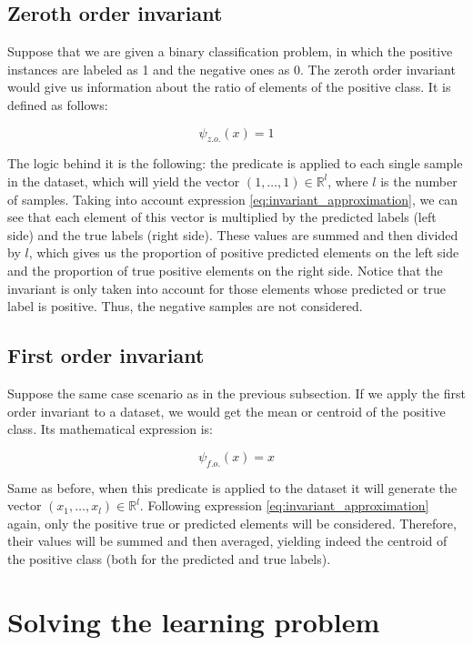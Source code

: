 \subsection{Zeroth order invariant}

Suppose that we are given a binary classification problem, in which the positive instances
are labeled as 1 and the negative ones as 0. The zeroth order invariant would give us information
about the ratio of elements of the positive class. It is defined as follows:

\[
    \psi_{z.o.}(x) = 1
\]

The logic behind it is the following: the predicate is applied to each single sample in the dataset,
which will yield the vector $(1, \dots, 1) \in \mathbb{R}^l $, where $l$ is the number of samples. Taking into account
expression \eqref{eq:invariant_approximation}, we can see that each element of this vector is multiplied
by the predicted labels (left side) and the true labels (right side). These values are summed and then divided
by $l$, which gives us the proportion of positive predicted elements on the left side and the proportion
of true positive elements on the right side. Notice that the invariant is only taken into account for those
elements whose predicted or true label is positive. Thus, the negative samples are not considered.

\subsection{First order invariant}

Suppose the same case scenario as in the previous subsection. If we apply the first order invariant to
a dataset, we would get the mean or centroid of the positive class. Its mathematical expression is:

\[
    \psi_{f.o.}(x) = x
\]

Same as before, when this predicate is applied to the dataset it will generate the vector
$(x_1, \dots, x_l) \in \mathbb{R}^l$. Following expression \eqref{eq:invariant_approximation} again,
only the positive true or predicted elements will be considered. Therefore, their values will be summed and
then averaged, yielding indeed the centroid of the positive class (both for the predicted and true labels).

\section{Solving the learning problem}
\label{sect:solvin_learning_problem}

